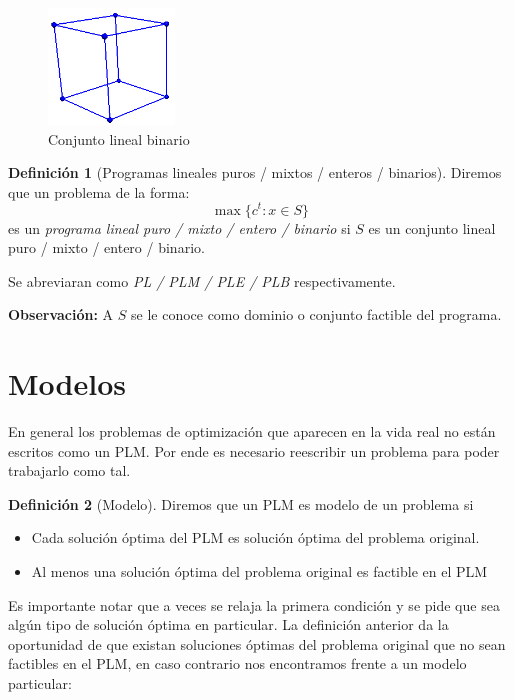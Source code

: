 \documentclass[10pt]{article}
\theoremstyle{plain}
\theoremstyle{definition}
\newtheorem{defi}{Definición}
\begin{document}
\newpage
\begin{figure}
    \centering
    \includegraphics[width=0.3\textwidth]{cube3.jpg}
    \caption{Conjunto lineal binario}
\end{figure}
\begin{defi}[Programas lineales puros / mixtos / enteros / binarios] Diremos que un problema de la forma:
$$
\max\{c^{t}\colon x \in S\}
$$
es un \emph{programa lineal puro / mixto / entero / binario} si $S$ es un conjunto lineal puro / mixto / entero / binario. 
\end{defi}

Se abreviaran como \emph{PL / PLM / PLE / PLB} respectivamente.

\textbf{Observación:} A $S$ se le conoce como dominio o conjunto factible del programa.
\section{Modelos}

En general los problemas de optimización que aparecen en la vida real no están escritos como un PLM. Por ende es necesario reescribir un problema para poder trabajarlo como tal.

\begin{defi}[Modelo] Diremos que un PLM es modelo de un problema si

\begin{itemize}
    \item Cada solución óptima del PLM es solución óptima del problema original.
    \item Al menos una solución óptima del problema original es factible en el PLM
\end{itemize}
\end{defi}

Es importante notar que a veces se relaja la primera condición y se pide que sea algún tipo de solución óptima en particular. La definición anterior da la oportunidad de que existan soluciones óptimas del problema original que no sean factibles en el PLM, en caso contrario nos encontramos frente a un modelo particular:
\end{document}
